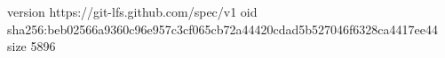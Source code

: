 version https://git-lfs.github.com/spec/v1
oid sha256:beb02566a9360c96e957c3cf065cb72a44420cdad5b527046f6328ca4417ee44
size 5896
